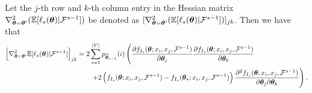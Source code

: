\begin{lemma}
\label{lemma:support-lemma2}
Let the $j$-th row and $k$-th column entry in the Hessian matrix $\nabla^2_{\bm{\theta} = \bm{\theta}^{\prime}}(\mathbb{E}[\ell_{s}(\bm{\theta})|\mathcal{F}^{s-1}])$ be denoted as $[\nabla^2_{\bm{\theta} = \bm{\theta}^{\prime}}(\mathbb{E}[\ell_{s}(\bm{\theta})|\mathcal{F}^{s-1}])]_{jk}$. Then we have that
\begin{align*}
     \left[\nabla^2_{\bm{\theta} = \bm{\theta}^{\prime}}  \mathbb{E}[\ell_{s}(\bm{\theta})|\mathcal{F}^{s-1}]\right]_{jk} &=  2\sum_{i=1}^{|V|} p_{{\widehat{\bm{\theta}}}_{s-1}}(i)\left( \dfrac{\partial f_{I_s}(\bm{\theta} ; x_i, x_j, \mathcal{F}^{s-1})}{\partial \bm{\theta}_j}\dfrac{\partial f_{I_s}(\bm{\theta} ; x_i, x_j, \mathcal{F}^{s-1})}{\partial \bm{\theta}_k}\right.\\
     &\qquad\left. + 2\left(f_{I_s}(\bm{\theta} ; x_i, x_j, \mathcal{F}^{s-1}) - f_{I_s}(\bm{\theta}_*; x_i, x_j, \mathcal{F}^{s-1})\right)\dfrac{\partial^2 f_{I_s}(\bm{\theta} ; x_i, x_j, \mathcal{F}^{s-1})}{\partial \bm{\theta}_j\partial\bm{\theta}_k}\right).
\end{align*}
\end{lemma}

